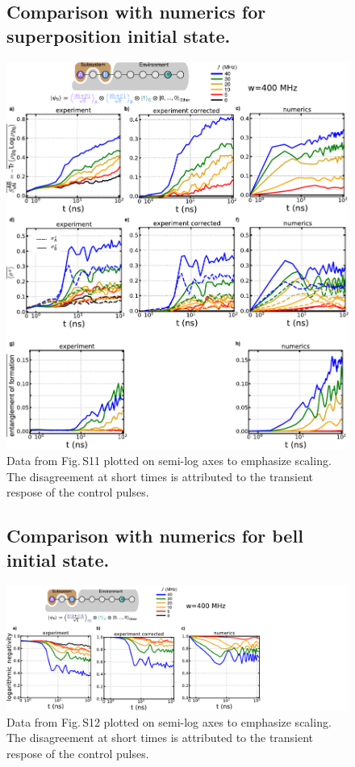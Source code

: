 \begin{figure}
\subsection{Comparison with numerics for superposition initial state.}
\centering
\includegraphics[width=140mm, keepaspectratio]{./PDF/dat_cor_num_superposition_log.pdf}
\caption{Data from Fig.\,S11 plotted on semi-log axes to emphasize scaling.  The disagreement at short times is attributed to the transient respose of the control pulses.}
\end{figure}

\begin{figure}
\subsection{Comparison with numerics for bell initial state.}
\centering
\hspace*{10mm}
\includegraphics[width=195mm, keepaspectratio]{./PDF/dat_cor_num_bell_log.pdf}
\caption{Data from Fig.\,S12 plotted on semi-log axes to emphasize scaling.  The disagreement at short times is attributed to the transient respose of the control pulses.}
\end{figure}

